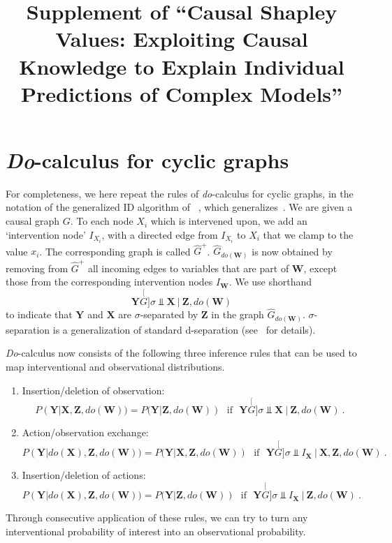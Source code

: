\documentclass{article}
\title{Supplement of ``Causal Shapley Values: Exploiting Causal Knowledge to Explain Individual Predictions of Complex Models''}
\newcommand{\vX}{\mathbf{X}}
\newcommand{\dodo}{\mathit{do}}
\begin{document}
\maketitle

\newcommand{\perpsg}{\stackrel[G]{\sigma}{\Perp}}
\newcommand{\vW}{\mathbf{W}}
\newcommand{\vY}{\mathbf{Y}}
\newcommand{\vZ}{\mathbf{Z}}

\section{\textit{Do}-calculus for cyclic graphs}

For completeness, we here repeat the rules of {\em do}-calculus for cyclic graphs, in the notation of the generalized ID algorithm of ~\cite{forre2019causal}, which generalizes~\cite{pearl2012calculus}. We are given a causal graph $G$. To each node $X_i$ which is intervened upon, we add an `intervention node' $I_{X_i}$, with a directed edge from $I_{X_i}$ to $X_i$ that we clamp to the value $x_i$. The corresponding graph is called $\hat{G}^+$. $\hat{G}_{\dodo(\vW)}$ is now obtained by removing from $\hat{G}^+$ all incoming edges to variables that are part of $\vW$, except those from the corresponding intervention nodes $I_{\vW}$. We use shorthand
\[
\vY \perpsg \vX ~|~ \vZ, \dodo(\mathbf{W})
\]
to indicate that $\vY$ and $\vX$ are $\sigma$-separated by $\vZ$ in the graph $\hat{G}_{\dodo(\vW)}$.  $\sigma$-separation is a generalization of standard d-separation (see~\cite{forre2019causal} for details).

\textit{Do}-calculus now consists of the following three inference rules that can be used to map interventional and observational distributions.
\begin{enumerate}
	\item Insertion/deletion of observation:
	\[
	 P(\vY|\vX,\vZ,\dodo(\vW)) = P(\vY|\vZ,\dodo(\vW)) \mbox{~~if~~} \vY \perpsg \vX ~|~ \vZ,\dodo(\vW) \: .
	\]
	\item Action/observation exchange:
	\[
	P(\vY|\dodo(\vX),\vZ,\dodo(\vW)) = P(\vY|\vX,\vZ,\dodo(\vW)) \mbox{~~if~~} \vY \perpsg I_{\vX} ~|~ \vX, \vZ, \dodo(\vW)  \: .
	\]
	\item Insertion/deletion of actions:
	\[
	P(\vY|\dodo(\vX),\vZ,\dodo(\vW)) = P(\vY|\vZ,\dodo(\vW)) \mbox{~~if~~} \vY \perpsg I_{\vX} ~|~ \vZ,\dodo(\vW) \: .
	\]	
\end{enumerate}
Through consecutive application of these rules, we can try to turn any interventional probability of interest into an observational probability.
\end{document}
